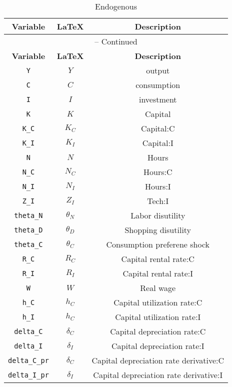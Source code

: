 \begin{center}
\begin{longtable}{ccc}
\caption{Endogenous}\\%
\hline%
\multicolumn{1}{c}{\textbf{Variable}} &
\multicolumn{1}{c}{\textbf{\LaTeX}} &
\multicolumn{1}{c}{\textbf{Description}}\\%
\hline\hline%
\endfirsthead
\multicolumn{3}{c}{{\tablename} \thetable{} -- Continued}\\%
\hline%
\multicolumn{1}{c}{\textbf{Variable}} &
\multicolumn{1}{c}{\textbf{\LaTeX}} &
\multicolumn{1}{c}{\textbf{Description}}\\%
\hline\hline%
\endhead
\texttt{Y} & ${Y}$ & output\\
\texttt{C} & ${C}$ & consumption\\
\texttt{I} & ${I}$ & investment\\
\texttt{K} & ${K}$ & Capital\\
\texttt{K\_C} & ${K_C}$ & Capital:C\\
\texttt{K\_I} & ${K_I}$ & Capital:I\\
\texttt{N} & ${N}$ & Hours\\
\texttt{N\_C} & ${N_C}$ & Hours:C\\
\texttt{N\_I} & ${N_I}$ & Hours:I\\
\texttt{Z\_I} & ${Z_I}$ & Tech:I\\
\texttt{theta\_N} & ${\theta_N}$ & Labor disutility\\
\texttt{theta\_D} & ${\theta_D}$ & Shopping disutility\\
\texttt{theta\_C} & ${\theta_C}$ & Consumption preferene shock\\
\texttt{R\_C} & ${R_C}$ & Capital rental rate:C\\
\texttt{R\_I} & ${R_I}$ & Capital rental rate:I\\
\texttt{W} & ${W}$ & Real wage\\
\texttt{h\_C} & ${h_C}$ & Capital utilization rate:C\\
\texttt{h\_I} & ${h_C}$ & Capital utilization rate:I\\
\texttt{delta\_C} & ${\delta_C}$ & Capital depreciation rate:C\\
\texttt{delta\_I} & ${\delta_I}$ & Capital depreciation rate:I\\
\texttt{delta\_C\_pr} & ${\delta_C}$ & Capital depreciation rate derivative:C\\
\texttt{delta\_I\_pr} & ${\delta_I}$ & Capital depreciation rate derivative:I\\

\end{longtable}
\end{center}
